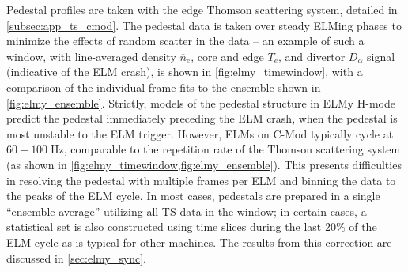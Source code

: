 Pedestal profiles are taken with the edge Thomson scattering system, detailed in \cref{subsec:app_ts_cmod}.  The pedestal data is taken over steady ELMing phases to minimize the effects of random scatter in the data -- an example of such a window, with line-averaged density $\overline{n}_e$, core and edge $T_e$, and divertor $D_\alpha$ signal (indicative of the ELM crash), is shown in \cref{fig:elmy_timewindow}, with a comparison of the individual-frame fits to the ensemble shown in \cref{fig:elmy_ensemble}.  Strictly, models of the pedestal structure in ELMy H-mode predict the pedestal immediately preceding the ELM crash, when the pedestal is most unstable to the ELM trigger.  However, ELMs on C-Mod typically cycle at $60-100 \;\si{\hertz}$, comparable to the repetition rate of the Thomson scattering system (as shown in \cref{fig:elmy_timewindow,fig:elmy_ensemble}).  This presents difficulties in resolving the pedestal with multiple frames per ELM and binning the data to the peaks of the ELM cycle.  In most cases, pedestals are prepared in a single ``ensemble average'' utilizing all TS data in the window; in certain cases, a statistical set is also constructed using time slices during the last 20\% of the ELM cycle as is typical for other machines.  The results from this correction are discussed in \cref{sec:elmy_sync}.

\begin{figure}
 \pushtooutside
\end{figure}

